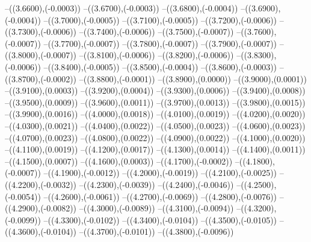 {	--({\sx*(3.6600)},{\sy*(-0.0003)})
	--({\sx*(3.6700)},{\sy*(-0.0003)})
	--({\sx*(3.6800)},{\sy*(-0.0004)})
	--({\sx*(3.6900)},{\sy*(-0.0004)})
	--({\sx*(3.7000)},{\sy*(-0.0005)})
	--({\sx*(3.7100)},{\sy*(-0.0005)})
	--({\sx*(3.7200)},{\sy*(-0.0006)})
	--({\sx*(3.7300)},{\sy*(-0.0006)})
	--({\sx*(3.7400)},{\sy*(-0.0006)})
	--({\sx*(3.7500)},{\sy*(-0.0007)})
	--({\sx*(3.7600)},{\sy*(-0.0007)})
	--({\sx*(3.7700)},{\sy*(-0.0007)})
	--({\sx*(3.7800)},{\sy*(-0.0007)})
	--({\sx*(3.7900)},{\sy*(-0.0007)})
	--({\sx*(3.8000)},{\sy*(-0.0007)})
	--({\sx*(3.8100)},{\sy*(-0.0006)})
	--({\sx*(3.8200)},{\sy*(-0.0006)})
	--({\sx*(3.8300)},{\sy*(-0.0006)})
	--({\sx*(3.8400)},{\sy*(-0.0005)})
	--({\sx*(3.8500)},{\sy*(-0.0004)})
	--({\sx*(3.8600)},{\sy*(-0.0003)})
	--({\sx*(3.8700)},{\sy*(-0.0002)})
	--({\sx*(3.8800)},{\sy*(-0.0001)})
	--({\sx*(3.8900)},{\sy*(0.0000)})
	--({\sx*(3.9000)},{\sy*(0.0001)})
	--({\sx*(3.9100)},{\sy*(0.0003)})
	--({\sx*(3.9200)},{\sy*(0.0004)})
	--({\sx*(3.9300)},{\sy*(0.0006)})
	--({\sx*(3.9400)},{\sy*(0.0008)})
	--({\sx*(3.9500)},{\sy*(0.0009)})
	--({\sx*(3.9600)},{\sy*(0.0011)})
	--({\sx*(3.9700)},{\sy*(0.0013)})
	--({\sx*(3.9800)},{\sy*(0.0015)})
	--({\sx*(3.9900)},{\sy*(0.0016)})
	--({\sx*(4.0000)},{\sy*(0.0018)})
	--({\sx*(4.0100)},{\sy*(0.0019)})
	--({\sx*(4.0200)},{\sy*(0.0020)})
	--({\sx*(4.0300)},{\sy*(0.0021)})
	--({\sx*(4.0400)},{\sy*(0.0022)})
	--({\sx*(4.0500)},{\sy*(0.0023)})
	--({\sx*(4.0600)},{\sy*(0.0023)})
	--({\sx*(4.0700)},{\sy*(0.0023)})
	--({\sx*(4.0800)},{\sy*(0.0022)})
	--({\sx*(4.0900)},{\sy*(0.0022)})
	--({\sx*(4.1000)},{\sy*(0.0020)})
	--({\sx*(4.1100)},{\sy*(0.0019)})
	--({\sx*(4.1200)},{\sy*(0.0017)})
	--({\sx*(4.1300)},{\sy*(0.0014)})
	--({\sx*(4.1400)},{\sy*(0.0011)})
	--({\sx*(4.1500)},{\sy*(0.0007)})
	--({\sx*(4.1600)},{\sy*(0.0003)})
	--({\sx*(4.1700)},{\sy*(-0.0002)})
	--({\sx*(4.1800)},{\sy*(-0.0007)})
	--({\sx*(4.1900)},{\sy*(-0.0012)})
	--({\sx*(4.2000)},{\sy*(-0.0019)})
	--({\sx*(4.2100)},{\sy*(-0.0025)})
	--({\sx*(4.2200)},{\sy*(-0.0032)})
	--({\sx*(4.2300)},{\sy*(-0.0039)})
	--({\sx*(4.2400)},{\sy*(-0.0046)})
	--({\sx*(4.2500)},{\sy*(-0.0054)})
	--({\sx*(4.2600)},{\sy*(-0.0061)})
	--({\sx*(4.2700)},{\sy*(-0.0069)})
	--({\sx*(4.2800)},{\sy*(-0.0076)})
	--({\sx*(4.2900)},{\sy*(-0.0082)})
	--({\sx*(4.3000)},{\sy*(-0.0089)})
	--({\sx*(4.3100)},{\sy*(-0.0094)})
	--({\sx*(4.3200)},{\sy*(-0.0099)})
	--({\sx*(4.3300)},{\sy*(-0.0102)})
	--({\sx*(4.3400)},{\sy*(-0.0104)})
	--({\sx*(4.3500)},{\sy*(-0.0105)})
	--({\sx*(4.3600)},{\sy*(-0.0104)})
	--({\sx*(4.3700)},{\sy*(-0.0101)})
	--({\sx*(4.3800)},{\sy*(-0.0096)})
}
